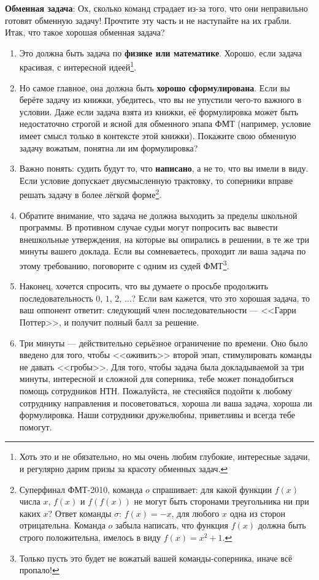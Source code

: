 \documentclass[12pt]{article}
\begin{document}
{\bf Обменная задача}: Ох, сколько команд страдает из-за того, что они неправильно готовят обменную задачу! Прочтите эту часть и не наступайте на их грабли. Итак, что такое хорошая обменная задача? 
\begin{enumerate}
\item Это должна быть задача по {\bf физике или математике}. Хорошо, если задача красивая, с интересной идеей\footnote{Хоть это и не обязательно, но мы очень любим глубокие, интересные задачи, и регулярно дарим призы за красоту обменных задач.}. 

\item Но самое главное, она должна быть {\bf хорошо сформулирована}. Если вы берёте задачу из книжки, убедитесь, что вы не упустили чего-то важного в условии. Даже если задача взята из книжки, её формулировка может быть недостаточно строгой и ясной для обменного эпапа ФМТ (например, условие имеет смысл только в контексте этой книжки). Покажите свою обменную задачу вожатым, понятна ли им формулировка? 

\item Важно понять: судить будут то, что {\bf написано}, а не то, что вы имели в виду. Если условие допускает двусмысленную трактовку, то соперники вправе решать задачу в более лёгкой форме\footnote{Суперфинал ФМТ-2010, команда $o$ спрашивает: для какой функции $f(x)$ числа $x$, $f(x)$ и $f(f(x))$ не могут быть сторонами треугольника ни при каких $x$? Ответ команды $\sigma$: $f(x) = -x$, для любого $x$ одна из сторон отрицательна. Команда $o$ забыла написать, что функция $f(x)$ должна быть строго положительна, имелось в виду $f(x) = x^2 + 1$.}. 

\item Обратите внимание, что задача не должна выходить за пределы школьной программы. В противном случае судьи могут попросить вас вывести внешкольные утверждения, на которые вы опирались в решении, в те же три минуты вашего доклада. Если вы сомневаетесь, проходит ли ваша задача по этому требованию, поговорите с одним из судей ФМТ\footnote{Только пусть это будет не вожатый вашей команды-соперника, иначе всё пропало!}.

\item Наконец, хочется спросить, что вы думаете о просьбе продолжить последовательность $0$, $1$, $2$, $\ldots$? Если вам кажется, что это хорошая задача, то ваш оппонент ответит: следующий член последовательности --- <<Гарри Поттер>>, и получит полный балл за решение.

\item Три минуты --- действительно серьёзное ограничение по времени. Оно было введено для того, чтобы <<оживить>> второй эпап, стимулировать команды не давать <<гробы>>. Для того, чтобы задача была докладываемой за три минуты, интересной и сложной для соперника, тебе может понадобиться помощь сотрудников НТН. Пожалуйста, не стесняйся подойти к любому сотруднику направления и посоветоваться, хороша ли ваша задача, хороша ли формулировка. Наши сотрудники дружелюбны, приветливы и всегда тебе помогут.
\end{enumerate}
\end{document}
